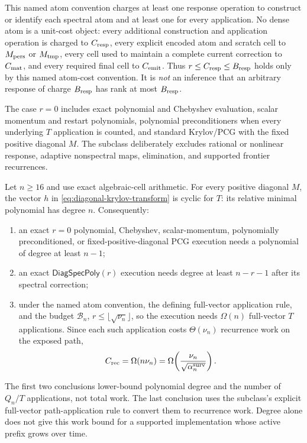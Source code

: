 This named atom convention charges at least one response operation to
construct or identify each spectral atom and at least one for every
application.  No dense atom is a unit-cost object: every additional
construction and application operation is charged to $C_{\rm resp}$, every
explicit encoded atom and scratch cell to $M_{\rm pers}$ or $M_{\rm tmp}$,
every cell used to maintain a complete current correction to $C_{\rm mat}$,
and every required final cell to $C_{\rm emit}$.  Thus
$r\leq C_{\rm resp}\leq B_{\rm resp}$ holds only by this named atom-cost
convention.  It is \emph{not} an inference that an arbitrary response of
charge $B_{\rm resp}$ has rank at most $B_{\rm resp}$.

The case $r=0$ includes exact polynomial and Chebyshev evaluation, scalar
momentum and restart polynomials, polynomial preconditioners when every
underlying $T$ application is counted, and standard Krylov/PCG with the fixed
positive diagonal $M$.  The subclass deliberately excludes rational or
nonlinear response, adaptive nonspectral maps, elimination, and supported
frontier recurrences.

\begin{theorem}
\label{thm:surviving-path-polynomial-obstruction}
Let $n\geq16$ and use exact algebraic-cell arithmetic.  For every positive
diagonal $M$, the vector $h$ in \cref{eq:diagonal-krylov-transform} is cyclic
for $T$: its relative minimal polynomial has degree $n$.  Consequently:
\begin{enumerate}[label=(\roman*)]
\item an exact $r=0$ polynomial, Chebyshev, scalar-momentum, polynomially
      preconditioned, or fixed-positive-diagonal PCG execution needs a
      polynomial of degree at least $n-1$;
\item an exact $\mathsf{DiagSpecPoly}(r)$ execution needs degree at least
      $n-r-1$ after its spectral correction;
\item under the named atom convention, the defining full-vector application
      rule, and the budget $\mathcal B_n$,
      $r\leq\lfloor\sqrt{\nu_n}\rfloor$, so the execution needs
      $\Omega(n)$ full-vector $T$ applications.  Since each such application
      costs $\Theta(\nu_n)$ recurrence work on the exposed path,
      \begin{equation}
       C_{\rm rec}=\Omega(n\nu_n)
       =\Omega\!\left(
          \frac{\nu_n}{\sqrt{\alpha_n^{\rm surv}}}
        \right).
       \label{eq:surviving-path-polynomial-work}
      \end{equation}
\end{enumerate}
The first two conclusions lower-bound polynomial degree and the number of
$Q_n/T$ applications, not total work.  The last conclusion uses the
subclass's explicit full-vector path-application rule to convert them to
recurrence work.  Degree alone does not give this work bound for a supported
implementation whose active prefix grows over time.
\end{theorem}

